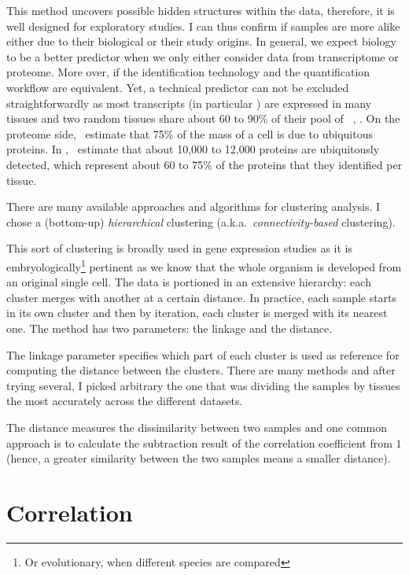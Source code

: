 This method uncovers possible hidden structures within the data, therefore,
it is well designed for exploratory studies.
I can thus confirm if samples are more alike either due to their
biological or their study origins. In general, we expect biology to be a better
predictor when we only either consider data from transcriptome or proteome.
More over, if the identification technology and the quantification workflow are
equivalent. Yet, a technical predictor can not be excluded straightforwardly
as most transcripts (in particular \mRNAs) are expressed in many tissues
and two random tissues share about 60 to 90\% of their pool of
\mRNAs~\citep{ramskoldan:2009}, \citep{UhlenGastro}.
On the proteome side,~\cite{PandeyData}
estimate that 75\% of the mass of a cell is due to ubiquitous proteins.
In ,~\cite{KusterData} estimate that about 10,000
to 12,000 proteins are ubiquitously detected, which represent about 60 to 75\%
of the proteins that they identified per tissue.

There are many available approaches and algorithms for clustering analysis.
I chose a (bottom-up) \emph{hierarchical} clustering
(a.k.a.\ \emph{connectivity-based} clustering).

This sort of clustering is broadly used in gene expression studies as it is
embryologically\footnote{Or evolutionary, when different species are compared}
pertinent as we know that the whole organism is developed from
an original single cell. The data is portioned in an extensive hierarchy:
each cluster merges with another at a certain distance.
In practice, each sample starts in its own cluster and then
by iteration, each cluster is merged with its nearest one. The method has
two parameters: the linkage and the distance.

The linkage parameter specifies which part of each cluster is used as reference
for computing the distance between the clusters. There are many methods and after
trying several, I picked arbitrary the one that was dividing
the samples by tissues the most accurately across the different datasets.

The distance measures the dissimilarity between two samples and one common
approach is to calculate the subtraction result of
the correlation coefficient from $1$ (hence, a greater similarity between the two
samples means a smaller distance).

\section{Correlation}

